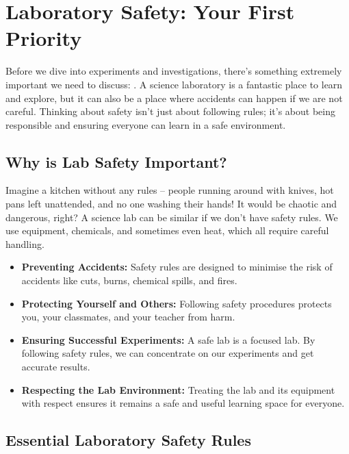 \section{Laboratory Safety: Your First Priority}

Before we dive into experiments and investigations, there’s something extremely important we need to discuss: .  A science laboratory is a fantastic place to learn and explore, but it can also be a place where accidents can happen if we are not careful.  Thinking about safety isn’t just about following rules; it's about being responsible and ensuring everyone can learn in a safe environment.


\subsection{Why is Lab Safety Important?}

Imagine a kitchen without any rules – people running around with knives, hot pans left unattended, and no one washing their hands! It would be chaotic and dangerous, right?  A science lab can be similar if we don't have safety rules.  We use equipment, chemicals, and sometimes even heat, which all require careful handling.

\begin{itemize}
    \item \textbf{Preventing Accidents:}  Safety rules are designed to minimise the risk of accidents like cuts, burns, chemical spills, and fires.
    \item \textbf{Protecting Yourself and Others:}  Following safety procedures protects you, your classmates, and your teacher from harm.
    \item \textbf{Ensuring Successful Experiments:}  A safe lab is a focused lab. By following safety rules, we can concentrate on our experiments and get accurate results.
    \item \textbf{Respecting the Lab Environment:}  Treating the lab and its equipment with respect ensures it remains a safe and useful learning space for everyone.
\end{itemize}

\subsection{Essential Laboratory Safety Rules}

